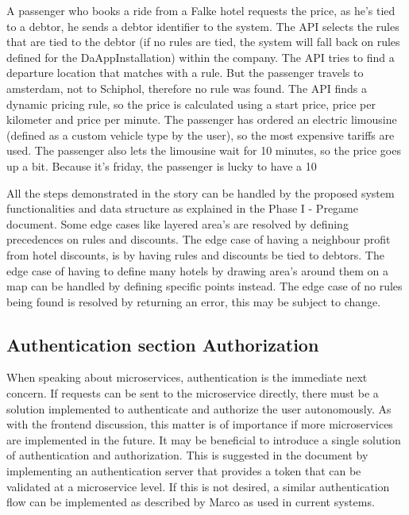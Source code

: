 A passenger who books a ride from a Falke hotel requests the price, as he’s tied to a debtor, he sends a debtor identifier to the system. The API selects the rules that are tied to the debtor (if no rules are tied, the system will fall back on rules defined for the DaAppInstallation) within the company. The API tries to find a departure location that matches with a rule. But the passenger travels to amsterdam, not to Schiphol, therefore no rule was found. The API finds a dynamic pricing rule, so the price is calculated using a start price, price per kilometer and price per minute. The passenger has ordered an electric limousine (defined as a custom vehicle type by the user), so the most expensive tariffs are used. The passenger also lets the limousine wait for 10 minutes, so the price goes up a bit. Because it’s friday, the passenger is lucky to have a 10%

All the steps demonstrated in the story can be handled by the proposed system functionalities and data structure as explained in the Phase I - Pregame document. Some edge cases like layered area’s are resolved by defining precedences on rules and discounts. The edge case of having a neighbour profit from hotel discounts, is by having rules and discounts be tied to debtors. The edge case of having to define many hotels by drawing area’s around them on a map can be handled by defining specific points instead. The edge case of no rules being found is resolved by returning an error, this may be subject to change.

\subsection{Authentication section Authorization}
When speaking about microservices, authentication is the immediate next concern. If requests can be sent to the microservice directly, there must be a solution implemented to authenticate and authorize the user autonomously. As with the frontend discussion, this matter is of importance if more microservices are implemented in the future. It may be beneficial to introduce a single solution of authentication and authorization. This is suggested in the document by implementing an authentication server that provides a token that can be validated at a microservice level. If this is not desired, a similar authentication flow can be implemented as described by Marco as used in current systems.

